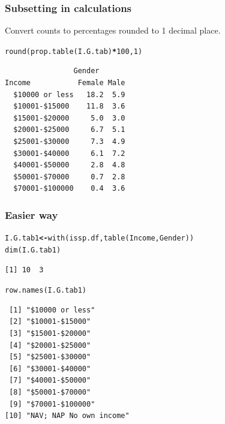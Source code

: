\documentclass{beamer}\usepackage[]{graphicx}\usepackage[]{color}
\makeatletter
\newcommand{\hlnum}[1]{\textcolor[rgb]{0.533,0,0.133}{#1}}%
\newcommand{\hlopt}[1]{\textcolor[rgb]{0,0,0}{\textbf{#1}}}%
\newcommand{\hlstd}[1]{\textcolor[rgb]{0,0,0}{#1}}%
\newcommand{\hlkwb}[1]{\textcolor[rgb]{0,0,0.4}{\textbf{#1}}}%
\newcommand{\hlkwd}[1]{\textcolor[rgb]{0,0.267,0.4}{#1}}%
\newenvironment{kframe}{%
 \def\at@end@of@kframe{}%
 \ifinner\ifhmode%
  \def\at@end@of@kframe{\end{minipage}}%
  \begin{minipage}{\columnwidth}%
 \fi\fi%
 \def\FrameCommand##1{\hskip\@totalleftmargin \hskip-\fboxsep
 \colorbox{shadecolor}{##1}\hskip-\fboxsep
     \hskip-\linewidth \hskip-\@totalleftmargin \hskip\columnwidth}%
 \MakeFramed {\advance\hsize-\width
   \@totalleftmargin\z@ \linewidth\hsize
   \@setminipage}}%
 {\par\unskip\endMakeFramed%
 \at@end@of@kframe}
\newenvironment{knitrout}{}{} %
\makeatother
\begin{document}
\begin{frame}[fragile]
\frametitle{Subsetting in calculations} 
Convert counts to percentages rounded to 1 decimal place.
\begin{knitrout}
\color{fgcolor}\begin{kframe}
\begin{alltt}
\hlkwd{round}\hlstd{(}\hlkwd{prop.table}\hlstd{(I.G.tab)}\hlopt{*}\hlnum{100}\hlstd{,} \hlnum{1}\hlstd{)}
\end{alltt}
\begin{verbatim}
                Gender
Income           Female Male
  $10000 or less   18.2  5.9
  $10001-$15000    11.8  3.6
  $15001-$20000     5.0  3.0
  $20001-$25000     6.7  5.1
  $25001-$30000     7.3  4.9
  $30001-$40000     6.1  7.2
  $40001-$50000     2.8  4.8
  $50001-$70000     0.7  2.8
  $70001-$100000    0.4  3.6
\end{verbatim}
\end{kframe}
\end{knitrout}
\end{frame}

\begin{frame}[fragile]
\frametitle{Easier way} 
\begin{knitrout}
\color{fgcolor}\begin{kframe}
\begin{alltt}
\hlstd{I.G.tab1} \hlkwb{<-} \hlkwd{with}\hlstd{(issp.df,} \hlkwd{table}\hlstd{(Income, Gender))}
\hlkwd{dim}\hlstd{(I.G.tab1)}
\end{alltt}
\begin{verbatim}
[1] 10  3
\end{verbatim}
\begin{alltt}
\hlkwd{row.names}\hlstd{(I.G.tab1)}
\end{alltt}
\begin{verbatim}
 [1] "$10000 or less"        
 [2] "$10001-$15000"         
 [3] "$15001-$20000"         
 [4] "$20001-$25000"         
 [5] "$25001-$30000"         
 [6] "$30001-$40000"         
 [7] "$40001-$50000"         
 [8] "$50001-$70000"         
 [9] "$70001-$100000"        
[10] "NAV; NAP No own income"
\end{verbatim}
\end{kframe}
\end{knitrout}
\end{frame}
\end{document}

